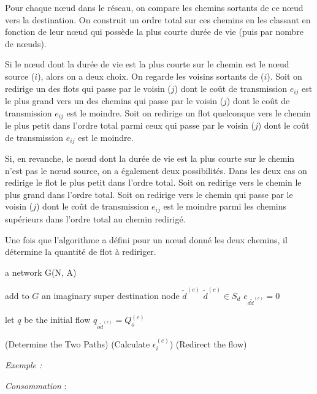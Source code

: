 Pour chaque nœud dans le réseau, on compare les chemins sortants de ce nœud vers la destination. On construit un ordre total sur ces chemins en les classant en fonction de leur nœud qui possède la plus courte durée de vie (puis par nombre de nœuds).

Si le nœud dont la durée de vie est la plus courte sur le chemin est le nœud source ($i$), alors on a deux choix. On regarde les voisins sortants de ($i$). Soit on redirige un des flots qui passe par le voisin ($j$) dont le coût de transmission $e_{ij}$ est le plus grand vers un des chemins qui passe par le voisin ($j$) dont le coût de transmission $e_{ij}$ est le moindre. Soit on redirige un flot quelconque vers le chemin le plus petit dans l'ordre total parmi ceux qui passe par le voisin ($j$) dont le coût de transmission $e_{ij}$ est le moindre.

Si, en revanche, le nœud dont la durée de vie est la plus courte sur le chemin n'est pas le nœud source, on a également deux possibilités. Dans les deux cas on redirige le flot le plus petit dans l'ordre total. Soit on redirige vers le chemin le plus grand dans l'ordre total. Soit on redirige vers le chemin qui passe par le voisin ($j$) dont le coût de transmission $e_{ij}$ est le moindre parmi les chemins supérieurs dans l'ordre total au chemin redirigé.

Une fois que l'algorithme a défini pour un nœud donné les deux chemins, il détermine la quantité de flot à rediriger.

\begin{algorithm}[H]
\caption{$FR()$}
\label{algo_FR}
\begin{algorithmic}
\REQUIRE a network G(N, A)

add to $G$ an imaginary super destination node $\tilde{d}^{(c)}$
	\STATE $\tilde{d}^{(c)} \in S_d$
	\STATE $e_{d \tilde{d}^{(c)}} = 0$
\ENDFOR

let $q$ be the initial flow
	\STATE $q_{o \tilde{d}^{(c)}} = Q_o^{(c)}$
\ENDFOR

		\STATE (Determine the Two Paths)
		\STATE (Calculate $\epsilon_i^{(c)}$)
		\STATE (Redirect the flow)
	\ENDFOR
\ENDFOR

\RETURN 
\end{algorithmic}
\end{algorithm}


\emph{Exemple :} %

\emph{Consommation} : 

